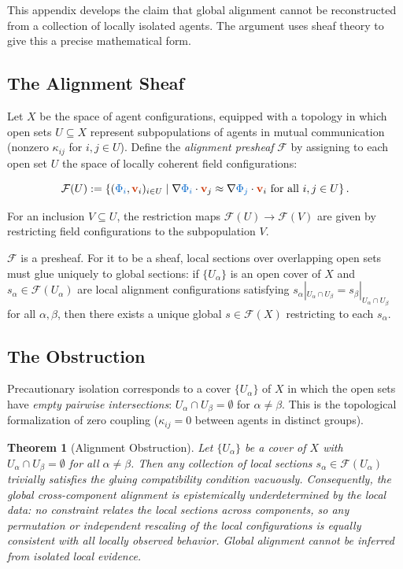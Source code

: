 \documentclass[11pt,a4paper]{article}
\newcommand{\scalar}[1]{\textcolor{scalarcolor}{\ensuremath{#1}}}
\newcommand{\vect}[1]{\textcolor{vectorcolor}{\ensuremath{\mathbf{#1}}}}
\theoremstyle{definition}
\theoremstyle{plain}
\newtheorem{theorem}{Theorem}
\begin{document}
\begin{mdframed}[style=appendixbox]

This appendix develops the claim that global alignment cannot be reconstructed from a collection of locally isolated agents. The argument uses sheaf theory to give this a precise mathematical form.

\subsection{The Alignment Sheaf}

Let $X$ be the space of agent configurations, equipped with a topology in which open sets $U \subseteq X$ represent subpopulations of agents in mutual communication (nonzero $\kappa_{ij}$ for $i, j \in U$). Define the \emph{alignment presheaf} $\mathcal{F}$ by assigning to each open set $U$ the space of locally coherent field configurations:

\begin{equation}
\mathcal{F}(U) := \left\{ (\scalar{\Phi_i}, \vect{v}_i)_{i \in U} \;\middle|\; \nabla\scalar{\Phi_i}\cdot\vect{v}_j \approx \nabla\scalar{\Phi_j}\cdot\vect{v}_i \text{ for all } i,j \in U \right\}.
\end{equation}

For an inclusion $V \subseteq U$, the restriction maps $\mathcal{F}(U) \to \mathcal{F}(V)$ are given by restricting field configurations to the subpopulation $V$.

$\mathcal{F}$ is a presheaf. For it to be a sheaf, local sections over overlapping open sets must glue uniquely to global sections: if $\{U_\alpha\}$ is an open cover of $X$ and $s_\alpha \in \mathcal{F}(U_\alpha)$ are local alignment configurations satisfying $s_\alpha|_{U_\alpha \cap U_\beta} = s_\beta|_{U_\alpha \cap U_\beta}$ for all $\alpha, \beta$, then there exists a unique global $s \in \mathcal{F}(X)$ restricting to each $s_\alpha$.

\subsection{The Obstruction}

Precautionary isolation corresponds to a cover $\{U_\alpha\}$ of $X$ in which the open sets have \emph{empty pairwise intersections}: $U_\alpha \cap U_\beta = \emptyset$ for $\alpha \neq \beta$. This is the topological formalization of zero coupling ($\kappa_{ij} = 0$ between agents in distinct groups).

\begin{theorem}[Alignment Obstruction]
Let $\{U_\alpha\}$ be a cover of $X$ with $U_\alpha \cap U_\beta = \emptyset$ for all $\alpha \neq \beta$. Then any collection of local sections $s_\alpha \in \mathcal{F}(U_\alpha)$ trivially satisfies the gluing compatibility condition vacuously. Consequently, the global cross-component alignment is \emph{epistemically underdetermined} by the local data: no constraint relates the local sections across components, so any permutation or independent rescaling of the local configurations is equally consistent with all locally observed behavior. Global alignment cannot be inferred from isolated local evidence.
\end{theorem}


\end{mdframed}
\end{document}

